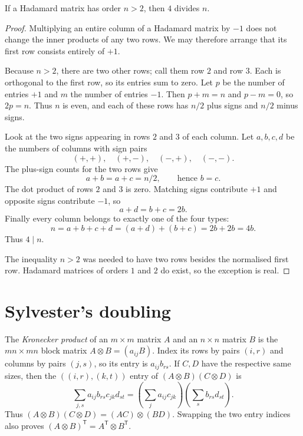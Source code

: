 \begin{proposition}\label{prop:hadamard-four}
If a Hadamard matrix has order $n>2$, then $4$ divides $n$.
\end{proposition}
\begin{proof}
Multiplying an entire column of a
Hadamard matrix by $-1$ does not change
the inner products of any two rows.
We may therefore arrange that its
first row consists entirely of $+1$.

Because $n>2$, there are two
other rows; call them row $2$
and row $3$. Each is orthogonal
to the first row, so its entries
sum to zero. Let $p$ be the number of entries $+1$ and $m$ the number of entries $-1$. Then $p+m=n$ and $p-m=0$, so $2p=n$. Thus $n$ is even, and each of these rows has $n/2$ plus signs and $n/2$ minus signs.

Look at the two signs appearing
in rows $2$ and $3$ of each column.
Let $a,b,c,d$ be the numbers
of columns with sign pairs
\[
(+,+),\quad (+,-),\quad
(-,+),\quad(-,-).
\]
The plus-sign counts for the
two rows give
\[
a+b=a+c=n/2,
\qquad\text{hence }b=c.
\]
The dot product of rows $2$ and
$3$ is zero. Matching signs
contribute $+1$ and opposite
signs contribute $-1$, so
\[
a+d=b+c=2b.
\]
Finally every column belongs
to exactly one of the four types:
\[
n=a+b+c+d
=(a+d)+(b+c)=2b+2b=4b.
\]
Thus $\boxed{4\mid n}$.

The inequality $n>2$ was needed
to have two rows besides the
normalised first row. Hadamard
matrices of orders $1$ and $2$
do exist, so the exception is real.
\end{proof}

\section{Sylvester's doubling}

The \emph{Kronecker product} of an $m\times m$ matrix $A$ and an $n\times n$
matrix $B$ is the $mn\times mn$ block matrix $A\otimes B=(a_{ij}B)$.
Index its rows by pairs $(i,r)$ and columns by pairs $(j,s)$, so its entry
is $a_{ij}b_{rs}$. If $C,D$ have the respective same sizes, then the
$((i,r),(k,t))$ entry of $(A\otimes B)(C\otimes D)$ is
\[
\sum_{j,s}a_{ij}b_{rs}c_{jk}d_{st}
=\left(\sum_j a_{ij}c_{jk}\right)
 \left(\sum_s b_{rs}d_{st}\right).
\]
Thus $(A\otimes B)(C\otimes D)=(AC)\otimes(BD)$.
Swapping the two entry indices also proves
$(A\otimes B)^{\mathsf T}=A^{\mathsf T}\otimes B^{\mathsf T}$.

